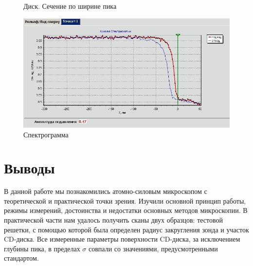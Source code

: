 \documentclass[a4paper,12pt]{article}
\theoremstyle{plain} %
\theoremstyle{definition} %
\theoremstyle{remark} %
\begin{document}
\begin{itemize}
\begin{enumerate}
\begin{figure}[H]
	\caption{Диск. Сечение по ширине пика}
	\label{pшс}
\end{figure}
\begin{figure}[H]
	\centering
	\includegraphics[scale=2]{fin.jpg}
	\caption{Спектрограмма}
	\label{pшс}
\end{figure}


	
\end{enumerate}
\section{Выводы}
В данной работе мы познакомились атомно-силовым микроскопом с теоретической и практической точки зрения. Изучили основной принцип работы, режимы измерений, достоинства и недостатки основных методов микроскопии. В практической части нам удалось получить сканы двух образцов: тестовой решетки, с помощью которой была определен радиус закругления зонда и участок CD-диска. Все измеренные параметры поверхности CD-диска, за исключением глубины пика, в пределах $\sigma$ совпали со значениями, предусмотренными стандартом.



         

 


\end{itemize}








	
\end{document}
